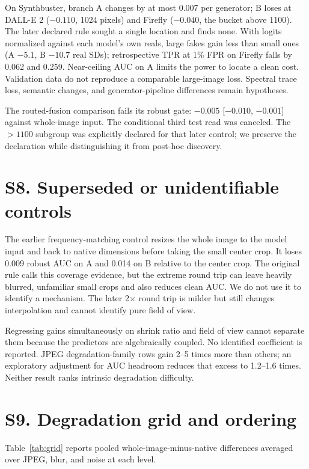 \documentclass[letterpaper]{article}
\begin{document}
On Synthbuster, branch A changes by at most 0.007 per generator; B loses at DALL-E 2 ($-0.110$, 1024 pixels) and Firefly ($-0.040$, the bucket above 1100). The later declared rule sought a single location and finds none. With logits normalized against each model's own reals, large fakes gain less than small ones (A $-5.1$, B $-10.7$ real SDs); retrospective TPR at 1\% FPR on Firefly falls by 0.062 and 0.259. Near-ceiling AUC on A limits the power to locate a clean cost. Validation data do not reproduce a comparable large-image loss. Spectral trace loss, semantic changes, and generator-pipeline differences remain hypotheses.

The routed-fusion comparison fails its robust gate: $-0.005$ [$-0.010$, $-0.001$] against whole-image input. The conditional third test read was canceled. The $>1100$ subgroup was explicitly declared for that later control; we preserve the declaration while distinguishing it from post-hoc discovery.

\section{S8. Superseded or unidentifiable controls}

The earlier frequency-matching control resizes the whole image to the model input and back to native dimensions before taking the small center crop. It loses 0.009 robust AUC on A and 0.014 on B relative to the center crop. The original rule calls this coverage evidence, but the extreme round trip can leave heavily blurred, unfamiliar small crops and also reduces clean AUC. We do not use it to identify a mechanism. The later 2$\times$ round trip is milder but still changes interpolation and cannot identify pure field of view.

Regressing gains simultaneously on shrink ratio and field of view cannot separate them because the predictors are algebraically coupled. No identified coefficient is reported. JPEG degradation-family rows gain 2--5 times more than others; an exploratory adjustment for AUC headroom reduces that excess to 1.2--1.6 times. Neither result ranks intrinsic degradation difficulty.

\section{S9. Degradation grid and ordering}

Table~\ref{tab:grid} reports pooled whole-image-minus-native differences averaged over JPEG, blur, and noise at each level.
\end{document}
